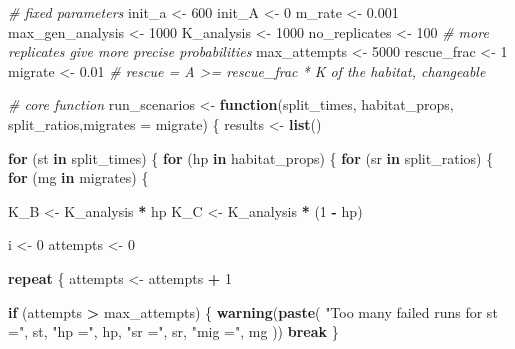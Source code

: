 \documentclass[
]{article}
\newenvironment{Shaded}{\begin{snugshade}}{\end{snugshade}}
\newcommand{\AttributeTok}[1]{\textcolor[rgb]{0.13,0.29,0.53}{#1}}
\newcommand{\CommentTok}[1]{\textcolor[rgb]{0.56,0.35,0.01}{\textit{#1}}}
\newcommand{\ControlFlowTok}[1]{\textcolor[rgb]{0.13,0.29,0.53}{\textbf{#1}}}
\newcommand{\DecValTok}[1]{\textcolor[rgb]{0.00,0.00,0.81}{#1}}
\newcommand{\FloatTok}[1]{\textcolor[rgb]{0.00,0.00,0.81}{#1}}
\newcommand{\FunctionTok}[1]{\textcolor[rgb]{0.13,0.29,0.53}{\textbf{#1}}}
\newcommand{\NormalTok}[1]{#1}
\newcommand{\OtherTok}[1]{\textcolor[rgb]{0.56,0.35,0.01}{#1}}
\newcommand{\SpecialCharTok}[1]{\textcolor[rgb]{0.81,0.36,0.00}{\textbf{#1}}}
\newcommand{\StringTok}[1]{\textcolor[rgb]{0.31,0.60,0.02}{#1}}
\begin{document}
\begin{Shaded}
\begin{Highlighting}[]
\CommentTok{\# fixed parameters}
\NormalTok{init\_a           }\OtherTok{\textless{}{-}} \DecValTok{600}
\NormalTok{init\_A           }\OtherTok{\textless{}{-}} \DecValTok{0}
\NormalTok{m\_rate           }\OtherTok{\textless{}{-}} \FloatTok{0.001}
\NormalTok{max\_gen\_analysis }\OtherTok{\textless{}{-}} \DecValTok{1000}
\NormalTok{K\_analysis       }\OtherTok{\textless{}{-}} \DecValTok{1000}
\NormalTok{no\_replicates    }\OtherTok{\textless{}{-}} \DecValTok{100}    \CommentTok{\# more replicates give more precise probabilities}
\NormalTok{max\_attempts     }\OtherTok{\textless{}{-}} \DecValTok{5000}
\NormalTok{rescue\_frac      }\OtherTok{\textless{}{-}} \DecValTok{1}  
\NormalTok{migrate          }\OtherTok{\textless{}{-}} \FloatTok{0.01}    \CommentTok{\# rescue = A \textgreater{}= rescue\_frac * K of the habitat, changeable }

\CommentTok{\# core function}
\NormalTok{run\_scenarios }\OtherTok{\textless{}{-}} \ControlFlowTok{function}\NormalTok{(split\_times, habitat\_props, split\_ratios,}\AttributeTok{migrates =}\NormalTok{ migrate) \{}
\NormalTok{  results }\OtherTok{\textless{}{-}} \FunctionTok{list}\NormalTok{()}
  
  \ControlFlowTok{for}\NormalTok{ (st }\ControlFlowTok{in}\NormalTok{ split\_times) \{}
    \ControlFlowTok{for}\NormalTok{ (hp }\ControlFlowTok{in}\NormalTok{ habitat\_props) \{}
      \ControlFlowTok{for}\NormalTok{ (sr }\ControlFlowTok{in}\NormalTok{ split\_ratios) \{}
        \ControlFlowTok{for}\NormalTok{ (mg }\ControlFlowTok{in}\NormalTok{ migrates) \{  }
        
\NormalTok{        K\_B }\OtherTok{\textless{}{-}}\NormalTok{ K\_analysis }\SpecialCharTok{*}\NormalTok{ hp}
\NormalTok{        K\_C }\OtherTok{\textless{}{-}}\NormalTok{ K\_analysis }\SpecialCharTok{*}\NormalTok{ (}\DecValTok{1} \SpecialCharTok{{-}}\NormalTok{ hp)}
        
\NormalTok{        i }\OtherTok{\textless{}{-}} \DecValTok{0}
\NormalTok{        attempts }\OtherTok{\textless{}{-}} \DecValTok{0}
        
        \ControlFlowTok{repeat}\NormalTok{ \{}
\NormalTok{          attempts }\OtherTok{\textless{}{-}}\NormalTok{ attempts }\SpecialCharTok{+} \DecValTok{1}
          
          \ControlFlowTok{if}\NormalTok{ (attempts }\SpecialCharTok{\textgreater{}}\NormalTok{ max\_attempts) \{}
            \FunctionTok{warning}\NormalTok{(}\FunctionTok{paste}\NormalTok{(}
              \StringTok{"Too many failed runs for st ="}\NormalTok{, st,}
              \StringTok{"hp ="}\NormalTok{, hp,}
              \StringTok{"sr ="}\NormalTok{, sr,}
              \StringTok{"mig ="}\NormalTok{, mg}
\NormalTok{            ))}
            \ControlFlowTok{break}
\NormalTok{          \}}
          

\end{Highlighting}
\end{Shaded}
\end{document}
